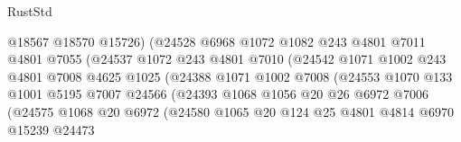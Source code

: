 \begin{lexlean}{RustStd}
\begin{coremodule}
                                  @18567
                                  @18570
                                  @15726)
                                (@24528
                                  @6968
                                  @1072
                                  @1082
                                  @243
                                  @4801
                                  @7011
                                  @4801
                                  @7055
                                  (@24537
                                    @1072
                                    @243
                                    @4801
                                    @7010
                                    (@24542
                                      @1071
                                      @1002
                                      @243
                                      @4801
                                      @7008
                                      @4625
                                      @1025
                                      (@24388
                                        @1071
                                        @1002
                                        @7008
                                        (@24553
                                          @1070
                                          @133
                                          @1001
                                          @5195
                                          @7007
                                          @24566
                                          (@24393
                                            @1068
                                            @1056
                                            @20
                                            @26
                                            @6972
                                            @7006
                                            (@24575
                                              @1068
                                              @20
                                              @6972
                                              (@24580
                                                @1065
                                                @20
                                                @124
                                                @25
                                                @4801
                                                @4814
                                                @6970
                                                @15239
                                                @24473

\end{coremodule}
\end{lexlean}
